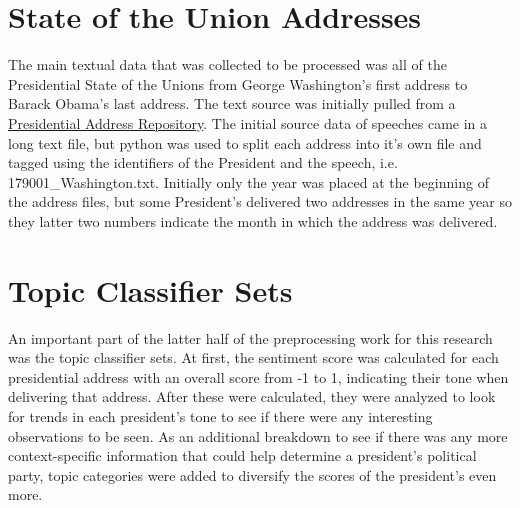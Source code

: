 \documentclass[reqno,12pt,oneside,letter]{report}
\begin{document}
\section{State of the Union Addresses}
	The main textual data that was collected to be processed was all of the Presidential State of the Unions from George Washington's first address to Barack Obama's last address.
The text source was initially pulled from a \href{http://stateoftheunion.onetwothree.net/appendices.html#source}{Presidential Address Repository}.
The initial source data of speeches came in a long text file, but python was used to split each address into it's own file and tagged using the identifiers of the President and the speech, i.e. 179001_Washington.txt.
Initially only the year was placed at the beginning of the address files, but some President's delivered two addresses in the same year so they latter two numbers indicate the month in which the address was delivered.

\section{Topic Classifier Sets}
	An important part of the latter half of the preprocessing work for this research was the topic classifier sets.
At first, the sentiment score was calculated for each presidential address with an overall score from -1 to 1, indicating their tone when delivering that address.
After these were calculated, they were analyzed to look for trends in each president's tone to see if there were any interesting observations to be seen.
As an additional breakdown to see if there was any more context-specific information that could help determine a president's political party, topic categories were added to diversify the scores of the president's even more.
\end{document}
